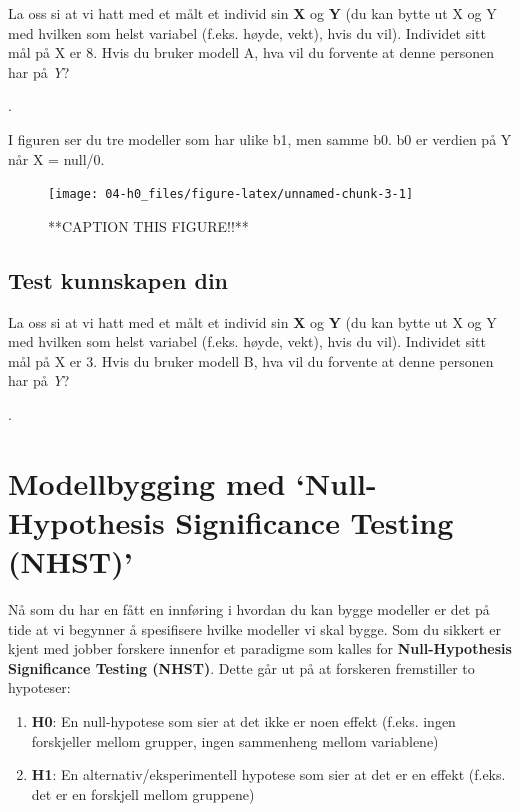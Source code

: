 \documentclass[
]{book}
\providecommand{\tightlist}{%
  \setlength{\itemsep}{0pt}\setlength{\parskip}{0pt}}
\begin{document}
La oss si at vi hatt med et målt et individ sin \textbf{X} og \textbf{Y} (du kan bytte ut X og Y med hvilken som helst variabel (f.eks. høyde, vekt), hvis du vil). Individet sitt mål på X er 8. Hvis du bruker modell A, hva vil du forvente at denne personen har på \emph{Y}?

.

I figuren ser du tre modeller som har ulike b1, men samme b0. b0 er verdien på Y når X = null/0.

\begin{figure}

{\centering \texttt{[image: 04-h0\_files/figure-latex/unnamed-chunk-3-1]} 

}

\caption{**CAPTION THIS FIGURE!!**}\label{fig:unnamed-chunk-3}
\end{figure}

\hypertarget{test-kunnskapen-din-1}{%
\subsection{Test kunnskapen din}\label{test-kunnskapen-din-1}}

La oss si at vi hatt med et målt et individ sin \textbf{X} og \textbf{Y} (du kan bytte ut X og Y med hvilken som helst variabel (f.eks. høyde, vekt), hvis du vil). Individet sitt mål på X er 3. Hvis du bruker modell B, hva vil du forvente at denne personen har på \emph{Y}?

.

\hypertarget{modellbygging-med-null-hypothesis-significance-testing-nhst}{%
\section{Modellbygging med `Null-Hypothesis Significance Testing (NHST)'}\label{modellbygging-med-null-hypothesis-significance-testing-nhst}}

Nå som du har en fått en innføring i hvordan du kan bygge modeller er det på tide at vi begynner å spesifisere hvilke modeller vi skal bygge. Som du sikkert er kjent med jobber forskere innenfor et paradigme som kalles for \textbf{Null-Hypothesis Significance Testing (NHST)}. Dette går ut på at forskeren fremstiller to hypoteser:

\begin{enumerate}
\def\labelenumi{\arabic{enumi}.}
\tightlist
\item
  \textbf{H0}: En null-hypotese som sier at det ikke er noen effekt (f.eks. ingen forskjeller mellom grupper, ingen sammenheng mellom variablene)
\item
  \textbf{H1}: En alternativ/eksperimentell hypotese som sier at det er en effekt (f.eks. det er en forskjell mellom gruppene)
\end{enumerate}
\end{document}
